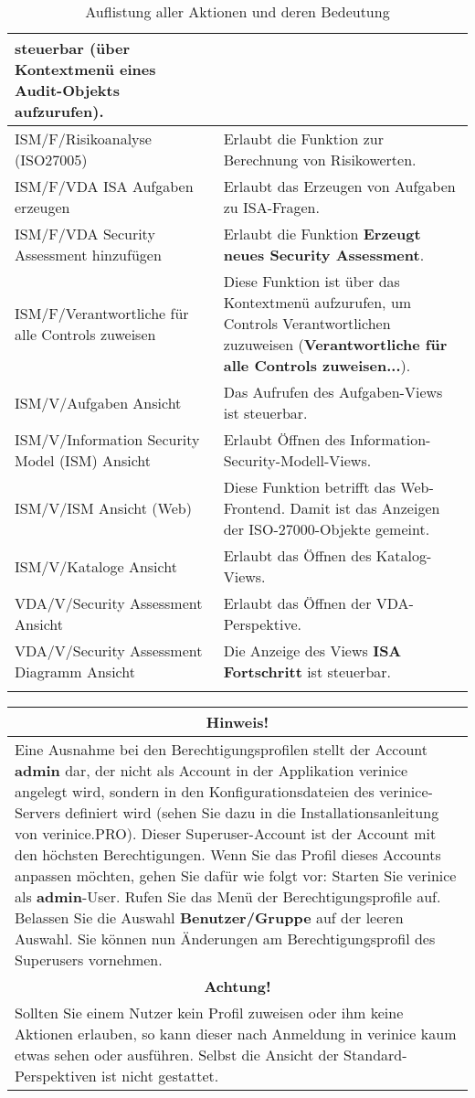 \documentclass[a4paper,10pt]{book}
\begin{document}
\begin{longtable}{| p{5cm} | p{6cm} |}
steuerbar (über Kontextmenü eines Audit-Objekts aufzurufen). \\[10pt] \hline
ISM/F/Risikoanalyse (ISO27005) & Erlaubt die Funktion zur Berechnung von
Risikowerten. \\[10pt] \hline
ISM/F/VDA ISA Aufgaben erzeugen & Erlaubt das Erzeugen von Aufgaben zu
ISA-Fragen. \\[10pt] \hline
ISM/F/VDA Security Assessment hinzufügen & Erlaubt die Funktion \textbf{Erzeugt
neues Security Assessment}. \\[10pt] \hline
ISM/F/Verantwortliche für alle Controls zuweisen & Diese Funktion ist über das
Kontextmenü aufzurufen, um Controls Verantwortlichen zuzuweisen
(\textbf{Verantwortliche für alle Controls zuweisen...}). \\[10pt] \hline
ISM/V/Aufgaben Ansicht & Das Aufrufen des Aufgaben-Views ist steuerbar.
\\[10pt] \hline
ISM/V/Information Security Model (ISM) Ansicht & Erlaubt Öffnen des
Information-Security-Modell-Views. \\[10pt] \hline
ISM/V/ISM Ansicht (Web) & Diese Funktion betrifft das Web-Frontend. Damit ist
das Anzeigen der ISO-27000-Objekte gemeint. \\[10pt] \hline
ISM/V/Kataloge Ansicht & Erlaubt das Öffnen des Katalog-Views. \\[10pt] \hline
VDA/V/Security Assessment Ansicht & Erlaubt das Öffnen der VDA-Perspektive.
\\[10pt] \hline
VDA/V/Security Assessment Diagramm Ansicht & Die Anzeige des Views \textbf{ISA
Fortschritt} ist steuerbar. \\[10pt] \hline
\caption{Auflistung aller Aktionen und deren Bedeutung}
\end{longtable}
\newpage
\begin{longtable}{| p{} |}
\hline
\multicolumn{1}{|c|}{\textbf{Hinweis!}} \\[10pt]
\hline\hline
Eine Ausnahme bei den Berechtigungsprofilen stellt der Account \textbf{admin} dar, der nicht als Account in der Applikation verinice angelegt wird,
sondern in den Konfigurationsdateien des verinice-Servers definiert wird (sehen Sie dazu in die Installationsanleitung von verinice.\textsc{PRO}).
Dieser Superuser-Account ist der Account mit den höchsten Berechtigungen.
Wenn Sie das Profil dieses Accounts anpassen möchten, gehen Sie dafür wie folgt vor: Starten Sie verinice als \textbf{admin}-User.
Rufen Sie das Menü der Berechtigungsprofile auf. Belassen Sie die Auswahl \textbf{Benutzer/Gruppe} auf der leeren Auswahl.
Sie können nun Änderungen am Berechtigungsprofil des Superusers vornehmen. \\[10pt] \hline
\multicolumn{1}{|c|}{\textbf{Achtung!}} \\[10pt]
\hline
Sollten Sie einem Nutzer kein Profil zuweisen oder ihm keine Aktionen erlauben, so kann dieser nach
Anmeldung in verinice kaum etwas sehen oder ausführen. Selbst die Ansicht der Standard-Perspektiven ist nicht gestattet. \\[10pt] \hline
\end{longtable}
\end{document}
